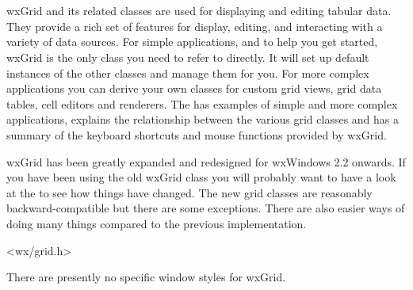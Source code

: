 \section{}\label{wxgrid}

wxGrid and its related classes are used for displaying and editing tabular
data.  They provide a rich set of features for display, editing, and
interacting with a variety of data sources. For simple applications, and to
help you get started, wxGrid is the only class you need to refer to
directly.  It will set up default instances of the other classes and manage
them for you.  For more complex applications you can derive your own
classes for custom grid views, grid data tables, cell editors and
renderers.  The  has
examples of simple and more complex applications, explains the
relationship between the various grid classes and has a summary of the
keyboard shortcuts and mouse functions provided by wxGrid.

wxGrid has been greatly expanded and redesigned for wxWindows 2.2
onwards. If you have been using the old wxGrid class you will probably
want to have a look at the  to see how things have changed. The new grid
classes are reasonably backward-compatible but there are some
exceptions.  There are also easier ways of doing many things compared to
the previous implementation. 



\begin{comment}
\helpref{wxScrolledWindow}{wxscrolledwindow}\\
\helpref{wxWindow}{wxwindow}\\
\helpref{wxEvtHandler}{wxevthandler}\\
\helpref{wxObject}{wxobject}
\end{comment}


<wx/grid.h>


There are presently no specific window styles for wxGrid.





